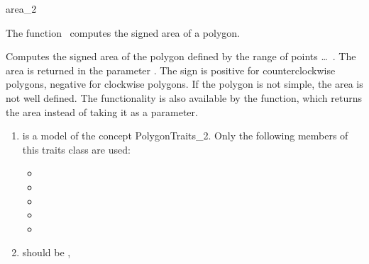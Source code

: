 

\begin{ccRefFunction}{area_2}  %


\ccDefinition
  
The function \ccRefName\ computes the signed area of a polygon.


{
Computes the signed area of the polygon defined by the range of points
 \ldots\ . The area is returned in the parameter
. The sign is positive for counterclockwise polygons, negative for
clockwise polygons. If the polygon is not simple, the area is not well defined.
The functionality is also available by the  function, which
returns the area instead of taking it as a parameter.
}

\begin{enumerate}
    \item {} is a model of the concept 
	  PolygonTraits\_2.
	  Only the following members of this traits class are used:
          \begin{itemize}
            \item {}
            \item {}
            \item {}
            \item {}
            \item {}
          \end{itemize}
    \item {} should be ,
\end{enumerate}


\end{ccRefFunction}
